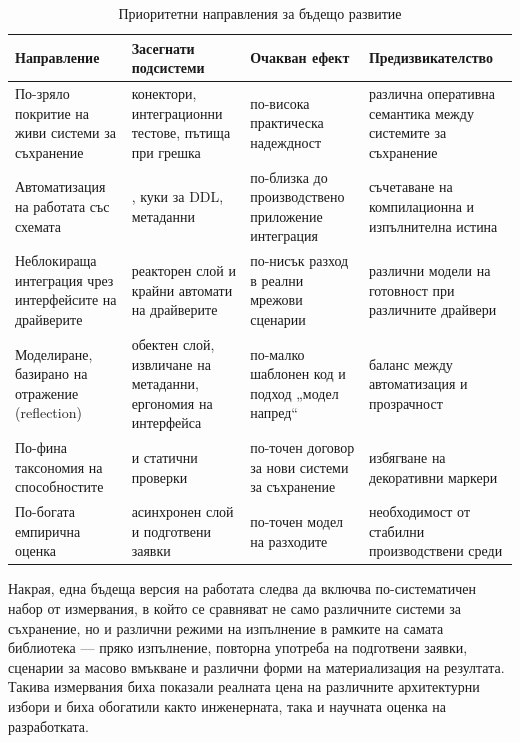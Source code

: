 \begin{table}[H]
\centering
\small
\caption{Приоритетни направления за бъдещо развитие}
\label{tab:future_work_priorities}
\begin{tabularx}{\textwidth}{L{2.8cm}L{3.7cm}L{2.9cm}Y}
\toprule
\textbf{Направление} & \textbf{Засегнати подсистеми} & \textbf{Очакван ефект} & \textbf{Предизвикателство} \\
\midrule
По-зряло покритие на живи системи за съхранение & конектори, интеграционни тестове, пътища при грешка & по-висока практическа надеждност & различна оперативна семантика между системите за съхранение \\
\hdashline
Автоматизация на работата със схемата & , куки за DDL, метаданни & по-близка до производствено приложение интеграция & съчетаване на компилационна и изпълнителна истина \\
\hdashline
Неблокираща интеграция чрез интерфейсите на драйверите & реакторен слой и крайни автомати на драйверите & по-нисък разход в реални мрежови сценарии & различни модели на готовност при различните драйвери \\
\hdashline
Моделиране, базирано на отражение (reflection) & обектен слой, извличане на метаданни, ергономия на интерфейса & по-малко шаблонен код и подход „модел напред“ & баланс между автоматизация и прозрачност \\
\hdashline
По-фина таксономия на способностите &  и статични проверки & по-точен договор за нови системи за съхранение & избягване на декоративни маркери \\
\hdashline
По-богата емпирична оценка & асинхронен слой и подготвени заявки & по-точен модел на разходите & необходимост от стабилни производствени среди \\
\bottomrule
\end{tabularx}
\end{table}

Накрая, една бъдеща версия на работата следва да включва по-систематичен набор от измервания, в който се сравняват не само различните системи за съхранение, но и различни режими на изпълнение в рамките на самата библиотека --- пряко изпълнение, повторна употреба на подготвени заявки, сценарии за масово вмъкване и различни форми на материализация на резултата. Такива измервания биха показали реалната цена на различните архитектурни избори и биха обогатили както инженерната, така и научната оценка на разработката.
